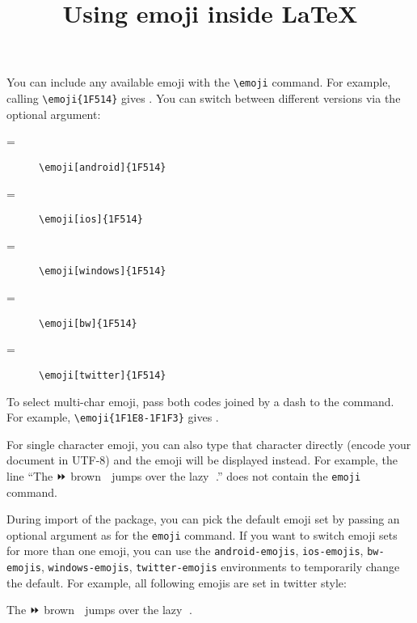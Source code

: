 \documentclass{article}
\title{Using emoji inside \LaTeX}
\newcommand{\dogline}{The ⏩ brown 🐺 jumps over the lazy 🐶.}
\begin{document}
\maketitle

You can include any available emoji with the \verb|\emoji| command. For example, calling \verb|\emoji{1F514}| gives . You can switch between different versions via the optional argument:
\begin{description}
\item[{} =] \verb|\emoji[android]{1F514}|
\item[{} =] \verb|\emoji[ios]{1F514}|
\item[{} =] \verb|\emoji[windows]{1F514}|
\item[{} =] \verb|\emoji[bw]{1F514}|
\item[{} =] \verb|\emoji[twitter]{1F514}|
\end{description}
To select multi-char emoji, pass both codes joined by a dash to the command. For example, \verb|\emoji{1F1E8-1F1F3}| gives .

For single character emoji, you can also type that character directly (encode your document in UTF-8) and the emoji will be displayed instead. For example, the line ``\dogline'' does not contain the \verb|emoji| command. 

During import of the package, you can pick the default emoji set by passing an optional argument as for the \verb|emoji| command. If you want to switch emoji sets for more than one emoji, you can use the \verb|android-emojis|, \verb|ios-emojis|, \verb|bw-emojis|, \verb|windows-emojis|, \verb|twitter-emojis| environments to temporarily change the default. For example, all following emojis are set in twitter style:
\begin{twitter-emojis}
\dogline
\end{twitter-emojis}
\end{document}
